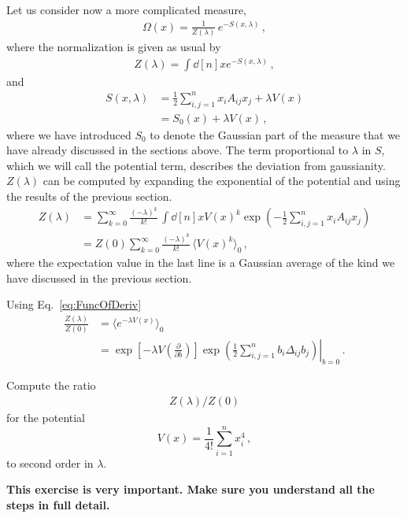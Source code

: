 \documentclass[notes.tex]{subfiles}
\begin{document}
Let us consider now a more complicated measure,
\begin{align}
  \label{eq:PertGaussMeas}
  \Omega(x) = \frac{1}{Z(\lambda)}\, e^{-S(x,\lambda)}\, ,
\end{align}
where the normalization is given as usual by
\begin{align}
  \label{eq:PertGaussNorm}
  Z(\lambda) = \int \dd[n]{x} e^{-S(x,\lambda)}\, ,
\end{align}
and
\begin{align}
  \label{eq:PertGaussAction}
  S(x,\lambda) & = \frac12 \sum_{i,j=1}^n x_i A_{ij} x_j +
  \lambda V(x)                                             \\
               & = S_0(x) + \lambda V(x)\, ,
\end{align}
where we have introduced $S_0$ to denote the Gaussian part of the
measure that we have already discussed in the sections above.  The
term proportional to $\lambda$ in $S$, which we will call the
potential term, describes the deviation from gaussianity.
$Z(\lambda)$ can be computed by expanding the exponential of the
potential and using the results of the previous section.
\begin{align}
  Z(\lambda) & = \sum_{k=0}^\infty \frac{(-\lambda)^k}{k!}\,
  \int \dd[n]{x} V(x)^k  \exp\left(
  -\frac12 \sum_{i,j=1}^n x_i A_{ij} x_j
  \right)                                                         \\
             & = Z(0) \sum_{k=0}^\infty \frac{(-\lambda)^k}{k!}\,
  \langle V(x)^k\rangle_0\, ,
\end{align}
where the expectation value in the last line is a Gaussian average of the kind we have discussed in the previous section.

Using Eq.~\ref{eq:FuncOfDeriv}
\begin{align}
  \frac{Z(\lambda)}{Z(0)} & = \langle e^{-\lambda V(x)} \rangle_0                                 \\
                          & = \exp\left[-\lambda V\left(\frac{\partial}{\partial b}\right)\right]
  \left. \exp\left(
  \frac12 \sum_{i,j=1}^n b_i \Delta_{ij} b_j
  \right) \right|_{b=0}\, .
\end{align}

\begin{Ex}
  Compute the ratio
  \begin{align}
    Z(\lambda)/Z(0)
  \end{align}
  for the potential
  \begin{equation}
    \label{eq:QuarticPot}
    V(x) = \frac{1}{4!} \sum_{i=1}^n x_i^4\, ,
  \end{equation}
  to second order in $\lambda$.

  \noindent\textbf{
    This exercise is very important. Make sure you understand all the steps in full detail. }
\end{Ex}
\end{document}
